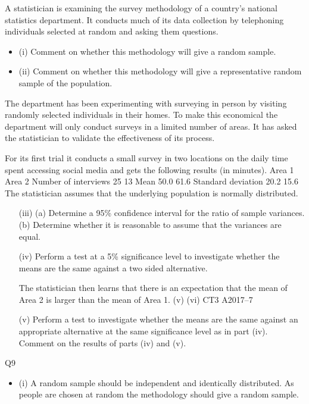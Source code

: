 \documentclass[a4paper,12pt]{article}
\begin{document}
\begin{enumerate}
A statistician is examining the survey methodology of a country’s national statistics department. It conducts much of its data collection by telephoning individuals
selected at random and asking them questions.
\begin{itemize}
\item (i) Comment on whether this methodology will give a random sample.

\item (ii) Comment on whether this methodology will give a representative random
sample of the population.
\end{itemize}
\medskip
The department has been experimenting with surveying in person by visiting randomly selected individuals in their homes. To make this economical the
department will only conduct surveys in a limited number of areas. It has asked the
statistician to validate the effectiveness of its process.

For its first trial it conducts a small survey in two locations on the daily time spent accessing social media and gets the following results (in minutes).
Area 1
Area 2
Number of
interviews
25
13
Mean
50.0
61.6
Standard
deviation
20.2
15.6
The statistician assumes that the underlying population is normally distributed.
\begin{itemize}
\item[(iii)]
(a) Determine a 95\% confidence interval for the ratio of sample variances.
(b) Determine whether it is reasonable to assume that the variances are
equal.
\item[(iv)]
Perform a test at a 5\% significance level to investigate whether the means are
the same against a two sided alternative.

The statistician then learns that there is an expectation that the mean of Area 2 is
larger than the mean of Area 1.
(v)
(vi)
CT3 A2017–7
\item[(v)]Perform a test to investigate whether the means are the same against an
appropriate alternative at the same significance level as in part (iv).
Comment on the results of parts (iv) and (v).

\end{itemize}


Q9
\begin{itemize}
\item (i) A random sample should be independent and identically distributed. As
people are chosen at random the methodology should give a random sample.


\end{itemize}
\end{enumerate}
\end{document}
